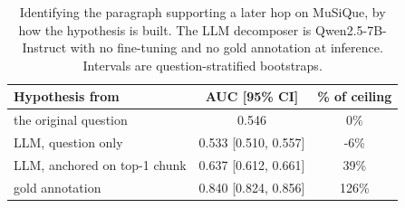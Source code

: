 \begin{table}[t]
\centering
\caption{Identifying the paragraph supporting a later hop on MuSiQue, by how the hypothesis is built. The LLM decomposer is Qwen2.5-7B-Instruct with no fine-tuning and no gold annotation at inference. Intervals are question-stratified bootstraps.}
\label{tab:llmdecomp}
\begin{tabular}{@{}lcc@{}}
\toprule
\textbf{Hypothesis from} & \textbf{AUC \small{[95\% CI]}} & \textbf{\% of ceiling}\\
\midrule
the original question & 0.546 & 0\%\\
LLM, question only & 0.533 \small{[0.510, 0.557]} & -6\%\\
LLM, anchored on top-1 chunk & 0.637 \small{[0.612, 0.661]} & 39\%\\
gold annotation & 0.840 \small{[0.824, 0.856]} & 126\%\\
\bottomrule
\end{tabular}
\end{table}
